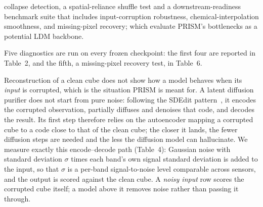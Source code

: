 %


collapse detection, a spatial-reliance shuffle test and a downstream-readiness
benchmark suite that includes input-corruption robustness, chemical-interpolation
smoothness, and missing-pixel recovery; which evaluate PRISM's bottlenecks as a
potential LDM backbone.


Five diagnostics are run on every frozen checkpoint: the first four are reported
in Table~2, and the fifth, a missing-pixel recovery test, in Table~6.


Reconstruction of a clean cube does not show how a model behaves when its
\emph{input} is corrupted, which is the situation PRISM is meant for. A latent
diffusion purifier does not start from pure noise: following the SDEdit
pattern~\citep{meng2022sdedit}, it encodes the corrupted observation, partially
diffuses and denoises that code, and decodes the result. Its first step
therefore relies on the autoencoder mapping a corrupted cube to a code close to
that of the clean cube; the closer it lands, the fewer diffusion steps are needed
and the less the diffusion model can hallucinate. We measure exactly this
encode--decode path (Table~4): Gaussian noise with standard deviation $\sigma$
times each band's own signal standard deviation is added to the input, so that
$\sigma$ is a per-band signal-to-noise level comparable across sensors, and the
output is scored against the clean cube. A \emph{noisy input} row scores the
corrupted cube itself; a model above it removes noise rather than passing it
through.

